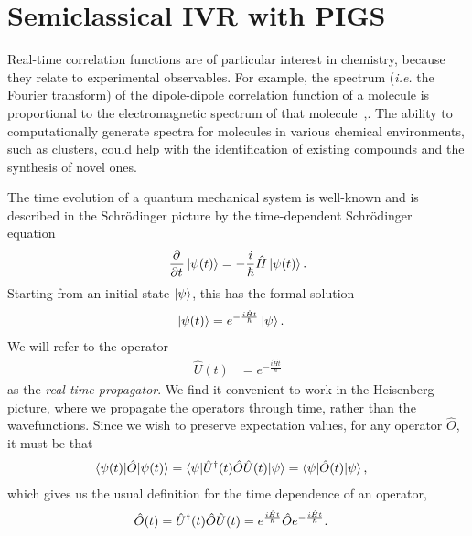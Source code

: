 \chapter{Semiclassical IVR with PIGS}

\label{chap:semiclassical}

Real-time correlation functions are of particular interest in chemistry, because they relate to experimental observables.
For example, the spectrum (\textit{i.e.} the Fourier transform) of the dipole-dipole correlation function of a molecule is proportional to the electromagnetic spectrum of that molecule~\cite[12,56]{zwanzig2001nonequilibrium},\cite[473]{mcquarrie1976statistical}.
The ability to computationally generate spectra for molecules in various chemical environments, such as clusters, could help with the identification of existing compounds and the synthesis of novel ones.

The time evolution of a quantum mechanical system is well-known and is described in the Schrödinger picture by the time-dependent Schrödinger equation~\cite[111]{dirac1981principles}
\begin{align}
	\dpd{}{t} \ket{\psi(t)} = -\frac{i}{\hbar} \hat{H} \ket{\psi(t)}.
\end{align}
Starting from an initial state $\ket{\psi}$, this has the formal solution
\begin{align}
	\ket{\psi(t)}
	&= e^{-\frac{i \hat{H} t}{\hbar}} \ket{\psi}.
\end{align}
We will refer to the operator
\begin{align}
	\hat{U}(t)
	&= e^{-\frac{i \hat{H} t}{\hbar}}
\end{align}
as the \emph{real-time propagator}.
We find it convenient to work in the Heisenberg picture, where we propagate the operators through time, rather than the wavefunctions.
Since we wish to preserve expectation values, for any operator $\hat{O}$, it must be that
\begin{align}
	\braket{\psi(t) | \hat{O} | \psi(t)}
	&= \braket{\psi | \hat{U}^\dagger(t) \hat{O} \hat{U}(t) | \psi}
	= \braket{\psi | \hat{O}(t) | \psi},
\end{align}
which gives us the usual definition for the time dependence of an operator,~\cite[315]{messiah1999quantum}
\begin{align}
	\hat{O}(t)
	&= \hat{U}^\dagger(t) \hat{O} \hat{U}(t)
	= e^{\frac{i \hat{H} t}{\hbar}} \hat{O} e^{-\frac{i \hat{H} t}{\hbar}}.
\end{align}

